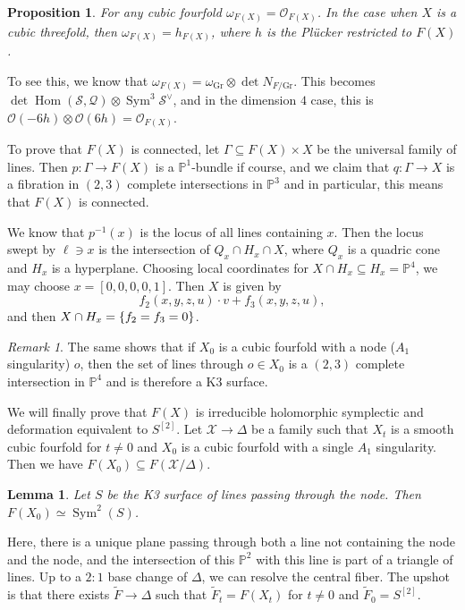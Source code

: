 \documentclass[leqno, openany]{memoir}
\newtheorem{prop}[thm]{Proposition}
\newtheorem{lem}[thm]{Lemma}
\theoremstyle{definition}
\theoremstyle{remark}
\newtheorem{rmk}[thm]{Remark}
\theoremstyle{plain}
\theoremstyle{definition}
\theoremstyle{remark}
\renewcommand{\P}{\mathbb{P}}
\newcommand{\mc}[1]{\mathcal{#1}}
\newcommand{\mr}[1]{\mathrm{#1}}
\newcommand{\on}[1]{\operatorname{#1}}
\newcommand{\wt}[1]{\widetilde{#1}}
\DeclareMathOperator{\Hom}{Hom}
\begin{document}
\begin{prop}
    For any cubic fourfold $\omega_{F(X)} = \mc{O}_{F(X)}$. In the case when $X$ is a cubic threefold, then $\omega_{F(X)} = h_{F(X)}$, where $h$ is the Pl\"ucker restricted to $F(X)$.
\end{prop}

To see this, we know that $\omega_{F(X)} = \omega_{\mr{Gr}} \otimes \det N_{F/\mr{Gr}}$. This becomes $\det \Hom(\mc{S}, \mc{Q}) \otimes \on{Sym}^3 \mc{S}^{\vee}$, and in the dimension $4$ case, this is $\mc{O}(-6h) \otimes \mc{O}(6h) = \mc{O}_{F(X)}$.

To prove that $F(X)$ is connected, let $\Gamma \subseteq F(X) \times X$ be the universal family of lines. Then $p \colon \Gamma \to F(X)$ is a $\P^1$-bundle if course, and we claim that $q \colon \Gamma \to X$ is a fibration in $(2,3)$ complete intersections in $\P^3$ and in particular, this means that $F(X)$ is connected.

We know that $p^{-1}(x)$ is the locus of all lines containing $x$. Then the locus swept by $\ell \ni x$ is the intersection of $Q_x \cap H_x \cap X$, where $Q_x$ is a quadric cone and $H_x$ is a hyperplane. Choosing local coordinates for $X \cap H_x \subseteq H_x = \P^4$, we may choose $x = [0,0,0,0,1]$. Then $X$ is given by
\[ f_2(x,y,z,u) \cdot v + f_3(x,y,z,u), \]
and then $X \cap H_x = \qty{f_2 = f_3 = 0}$.

\begin{rmk}
    The same shows that if $X_0$ is a cubic fourfold with a node ($A_1$ singularity) $o$, then the set of lines through $o \in X_0$ is a $(2,3)$ complete intersection in $\P^4$ and is therefore a K3 surface.
\end{rmk}

We will finally prove that $F(X)$ is irreducible holomorphic symplectic and deformation equivalent to $S^{[2]}$. Let $\mc{X} \to \Delta$ be a family such that $X_t$ is a smooth cubic fourfold for $t \neq 0$ and $X_0$ is a cubic fourfold with a single $A_1$ singularity. Then we have $F(X_0) \subseteq F(\mc{X}/\Delta)$.

\begin{lem}
    Let $S$ be the K3 surface of lines passing through the node. Then $F(X_0) \simeq \on{Sym}^2(S)$.
\end{lem}

Here, there is a unique plane passing through both a line not containing the node and the node, and the intersection of this $\P^2$ with this line is part of a triangle of lines. Up to a $2:1$ base change of $\Delta$, we can resolve the central fiber. The upshot is that there exists $\wt{F} \to \Delta$ such that $\wt{F}_t = F(X_t)$ for $t \neq 0$ and $\wt{F}_0 = S^{[2]}$.
\end{document}
